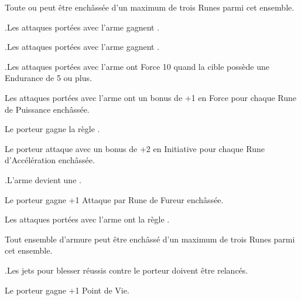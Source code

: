 \begin{multicols}{2}\raggedcolumns

\subtitle{Runes d'Arme}\vspace{5pt}

Toute \hw{} ou \pw{} peut être enchâssée d'un maximum de trois Runes parmi cet ensemble.

\startpricelist

\oneofakind{}.\newline Les attaques portées avec l'arme gagnent .

\oneofakind{}.\newline Les attaques portées avec l'arme gagnent .

\oneofakind{}.\newline Les attaques portées avec l'arme ont Force 10 quand la cible possède une Endurance de 5 ou plus.

Les attaques portées avec l'arme ont un bonus de +1 en Force pour chaque Rune de Puissance enchâssée.

Le porteur gagne la règle \lightningreflexes{}.

Le porteur attaque avec un bonus de +2 en Initiative pour chaque Rune d'Accélération enchâssée.

\oneofakind{}.\newline L'arme devient une \gw{}.

Le porteur gagne +1 Attaque par Rune de Fureur enchâssée.

Les attaques portées avec l'arme ont la règle \flamingattacks{}.

\endpricelist

\columnbreak
\subtitle{Runes d'Armure}\vspace{5pt}

Tout ensemble d'armure peut être enchâssé d'un maximum de trois Runes parmi cet ensemble.

\startpricelist

\oneofakind{}.\newline Les jets pour blesser réussis contre le porteur doivent être relancés.

Le porteur gagne +1 Point de Vie.


\end{multicols}
